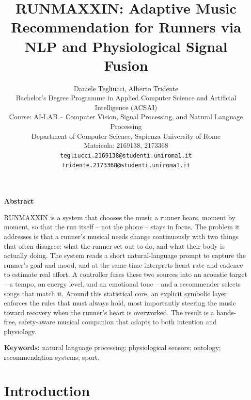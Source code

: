\documentclass[11pt,a4paper]{article}
\title{\textbf{RUNMAXXIN: Adaptive Music Recommendation for Runners via NLP and Physiological Signal Fusion}}
\author{
	Daniele Tegliucci, Alberto Tridente\\
	Bachelor's Degree Programme in Applied Computer Science and Artificial Intelligence (ACSAI)\\
	Course: AI-LAB -- Computer Vision, Signal Processing, and Natural Language Processing\\
	Department of Computer Science, Sapienza University of Rome\\
	Matricola: 2169138, 2173368\\
	\texttt{tegliucci.2169138@studenti.uniroma1.it}\\
	\texttt{tridente.2173368@studenti.uniroma1.it}
}
\date{}
\begin{document}
	\maketitle

	\begin{center}
	\begin{minipage}{0.86\textwidth}
		\small
		\begin{center}\textbf{Abstract}\end{center}
		\noindent RUNMAXXIN is a system that chooses the music a runner hears, moment by moment, so that the run itself -- not the phone -- stays in focus. The problem it addresses is that a runner's musical needs change continuously with two things that often disagree: what the runner set out to do, and what their body is actually doing. The system reads a short natural-language prompt to capture the runner's goal and mood, and at the same time interprets heart rate and cadence to estimate real effort. A controller fuses these two sources into an acoustic target -- a tempo, an energy level, and an emotional tone -- and a recommender selects songs that match it. Around this statistical core, an explicit symbolic layer enforces the rules that must always hold, most importantly steering the music toward recovery when the runner's heart is overworked. The result is a hands-free, safety-aware musical companion that adapts to both intention and physiology.

		\vspace{5pt}
		\noindent\textbf{Keywords:} natural language processing; physiological sensors; ontology; recommendation systems; sport.
	\end{minipage}
	\end{center}

	\vspace{6pt}

	\section{Introduction}
\end{document}
